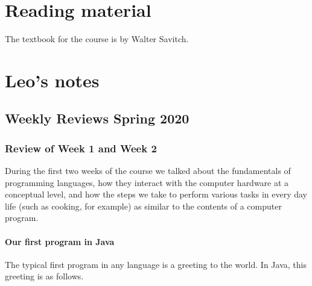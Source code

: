 \documentclass[letterpaper,10pt,english]{sphinxmanual}
\begin{document}
\section{Reading material}
\label{\detokenize{COMP170/reading:reading-material}}\label{\detokenize{COMP170/reading::doc}}
The textbook for the course is  by Walter Savitch.


\section{Leo’s notes}
\label{\detokenize{COMP170/notes:leo-s-notes}}\label{\detokenize{COMP170/notes::doc}}

\subsection{Weekly Reviews \sphinxhyphen{} Spring 2020}
\label{\detokenize{COMP170/2020Spring/weeklyReviews:weekly-reviews-spring-2020}}\label{\detokenize{COMP170/2020Spring/weeklyReviews::doc}}

\subsubsection{Review of Week 1 and Week 2}
\label{\detokenize{COMP170/2020Spring/week2:review-of-week-1-and-week-2}}\label{\detokenize{COMP170/2020Spring/week2::doc}}
During the first two weeks of the course we talked about the fundamentals of programming languages, how they interact with the computer hardware at a conceptual level, and how  the steps we take to perform various tasks in every day life (such as cooking, for example) as similar to the contents of a computer program.


\paragraph{Our first program in Java}
\label{\detokenize{COMP170/2020Spring/week2:our-first-program-in-java}}
The typical first program in any language is a greeting to the world. In Java, this greeting is as follows.

\begin{sphinxVerbatim}[commandchars=\\\{\},numbers=left,firstnumber=1,stepnumber=1]
   
     \PYG{o}{[}\PYG{o}{]}  
\end{sphinxVerbatim}
\end{document}

